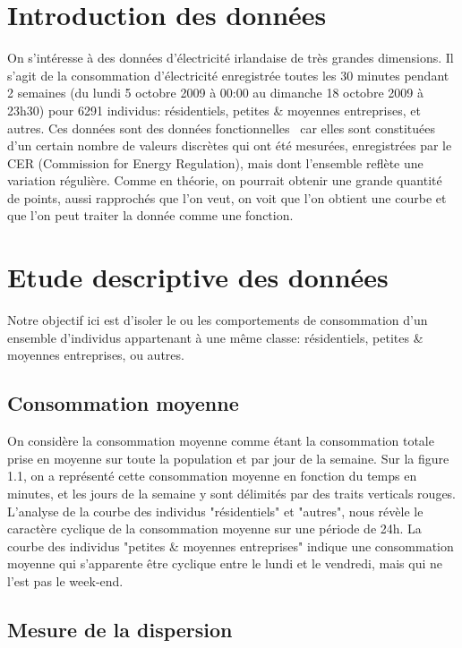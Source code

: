 
\section{Introduction des données}

On s'intéresse à des données d'électricité irlandaise de très grandes dimensions. Il s'agit de la consommation d'électricité enregistrée toutes les 30 minutes pendant 2 semaines (du lundi 5 octobre 2009 à 00:00 au dimanche 18 octobre 2009 à 23h30) pour 6291 individus: résidentiels, petites \& moyennes entreprises, et autres.
Ces données sont des données fonctionnelles~\cite{ahmedInfluenceMaterialProperty2019} car elles sont constituées d’un certain nombre de valeurs discrètes qui ont été mesurées, enregistrées par le CER (Commission for Energy Regulation), mais dont l’ensemble reflète une variation régulière. Comme en théorie, on pourrait obtenir une grande quantité de points, aussi rapprochés que l’on veut, on voit que l’on obtient une courbe et que l’on peut traiter la donnée comme une fonction.

\section{Etude descriptive des données}

Notre objectif ici est d'isoler le ou les comportements de consommation d'un ensemble d'individus appartenant à une même classe: résidentiels, petites \& moyennes entreprises, ou autres.

\subsection{Consommation moyenne}

On considère la consommation moyenne comme étant la consommation totale prise en moyenne sur toute la population et par jour de la semaine. Sur la figure 1.1, on a représenté cette consommation moyenne en fonction du temps en minutes, et les jours de la semaine y sont délimités par des traits verticals rouges.
L'analyse de la courbe des individus "résidentiels" et "autres", nous révèle le caractère cyclique de la consommation moyenne sur une période de 24h. La courbe des individus "petites \& moyennes entreprises" indique une consommation moyenne qui s'apparente être cyclique entre le lundi et le vendredi, mais qui ne l'est pas le week-end.

\subsection{Mesure de la dispersion}

